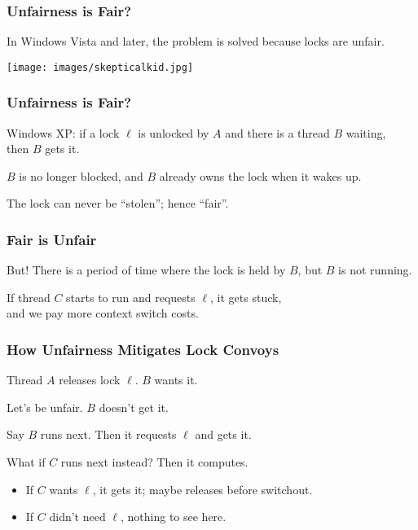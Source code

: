\begin{frame}
\frametitle{Unfairness is Fair?}

In Windows Vista and later, the problem is solved because locks are unfair.

\begin{center}
	\texttt{[image: images/skepticalkid.jpg]}
\end{center}

\end{frame}

\begin{frame}
\frametitle{Unfairness is Fair?}

Windows XP: if a lock $\ell$ is unlocked by $A$ and there is a thread $B$ waiting, \\
\qquad then $B$ gets it.

$B$ is no longer blocked, and $B$ already owns the lock when it wakes up.

The lock can never be ``stolen''; hence ``fair''.

\end{frame}

\begin{frame}
\frametitle{Fair is Unfair}


But! There is a period of time where the lock is held by $B$, but $B$ is not running.

If thread $C$ starts to run and requests $\ell$, it gets stuck, \\
\qquad and we pay more context switch costs.


\end{frame}

\begin{frame}
\frametitle{How Unfairness Mitigates Lock Convoys}


Thread $A$ releases lock $\ell$. $B$ wants it.

Let's be unfair. $B$ doesn't get it.

Say $B$ runs next. Then it requests $\ell$ and gets it.

What if $C$ runs next instead? Then it computes.
\begin{itemize}
\item If $C$ wants $\ell$, it gets it; maybe releases before switchout.
\item If $C$ didn't need $\ell$, nothing to see here.
\end{itemize}


\end{frame}

